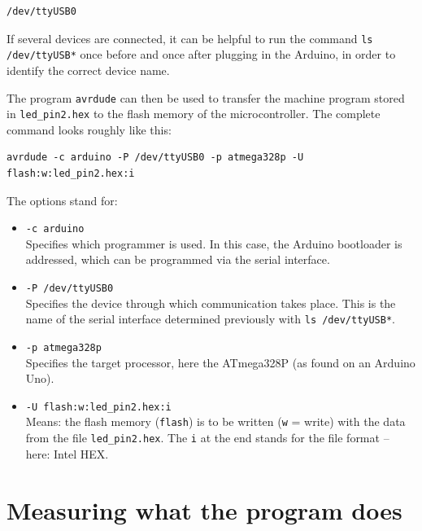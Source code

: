 \documentclass[a4paper,12pt]{article}
\begin{document}
\begin{lstlisting}
/dev/ttyUSB0
\end{lstlisting}

\begin{tcolorbox}[
	colback=myblue!5!white,
	colframe=myblue,
	title=Note
    ]
If several devices are connected, it can be helpful to run the command
\texttt{ls /dev/ttyUSB*} once before and once after plugging in the Arduino,
in order to identify the correct device name.
\end{tcolorbox}

\noindent
The program \texttt{avrdude} can then be used to transfer the machine program
stored in \texttt{led\_pin2.hex} to the flash memory of the microcontroller. The
complete command looks roughly like this:

\begin{lstlisting}[basicstyle=\ttfamily]
avrdude -c arduino -P /dev/ttyUSB0 -p atmega328p -U flash:w:led_pin2.hex:i
\end{lstlisting}

The options stand for:

\begin{itemize}
    \item \texttt{-c arduino} \\
	Specifies which programmer is used. In this case, the Arduino
	bootloader is addressed, which can be programmed via the serial
	interface.

    \item \texttt{-P /dev/ttyUSB0} \\
	Specifies the device through which communication takes place. This is
	the name of the serial interface determined previously with
	\texttt{ls /dev/ttyUSB*}.

    \item \texttt{-p atmega328p} \\
	Specifies the target processor, here the ATmega328P (as found on an
	Arduino Uno).

    \item \texttt{-U flash:w:led\_pin2.hex:i} \\
	Means: the flash memory (\texttt{flash}) is to be written
	(\texttt{w} = write) with the data from the file
	\texttt{led\_pin2.hex}. The \texttt{i} at the end stands for the file
	format – here: Intel HEX.
\end{itemize}

\newpage
\section{Measuring what the program does}
\end{document}
